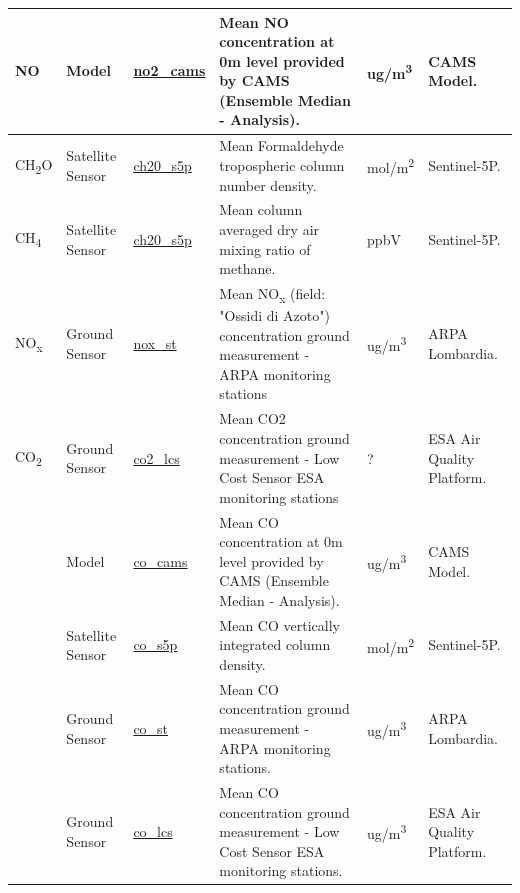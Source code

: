 \begin{center}
\begin{longtable}{ |p{2cm}|p{1.5cm}|p{2.3cm}|p{4cm}|p{1cm}|p{2cm}| }
\multirow{1}{4em}{NO} & Model  & \underline{no2\_cams} & Mean NO concentration at 0m level provided by CAMS  (Ensemble Median - Analysis). & ug/m\textsuperscript{3} & CAMS Model.\\  \hline

\multirow{1}{4em}{CH\textsubscript{2}O} & Satellite \newline Sensor  & \underline{ch20\_s5p} & Mean Formaldehyde tropospheric column number density. & mol/m\textsuperscript{2} & Sentinel-5P.\\  \hline

\multirow{1}{4em}{CH\textsubscript{4}} & Satellite \newline Sensor  & \underline{ch20\_s5p} & Mean column averaged dry air mixing ratio of methane. & ppbV & Sentinel-5P.\\  \hline

\multirow{1}{4em}{NO\textsubscript{x}} & Ground \newline Sensor & \underline{nox\_st} &  Mean NO\textsubscript{x} (field: "Ossidi di Azoto") concentration ground measurement - ARPA monitoring stations  & ug/m\textsuperscript{3} & ARPA \newline Lombardia.\\ \hline

\multirow{1}{4em}{CO\textsubscript{2}} & Ground \newline Sensor & \underline{co2\_lcs} &  Mean CO2 concentration ground measurement - Low Cost Sensor ESA monitoring stations & ? & ESA Air Quality Platform.\\ \hline
\pagebreak
\hline
\multirow{4}{4em}{CO} & Model  & \underline{co\_cams} & Mean CO concentration at 0m level provided by CAMS  (Ensemble Median - Analysis). & ug/m\textsuperscript{3} & CAMS Model.\\ 
& Satellite \newline Sensor  & \underline{co\_s5p} &  Mean CO vertically integrated column density. & mol/m\textsuperscript{2} & Sentinel-5P.\\ 
& Ground \newline Sensor & \underline{co\_st} &  Mean CO concentration ground measurement - ARPA monitoring stations.  & ug/m\textsuperscript{3} & ARPA \newline Lombardia.\\ 
& Ground \newline Sensor & \underline{co\_lcs} &  Mean CO concentration ground measurement - Low Cost Sensor ESA monitoring stations.  & ug/m\textsuperscript{3} & ESA Air Quality Platform.\\ \hline


\end{longtable}
\end{center}
